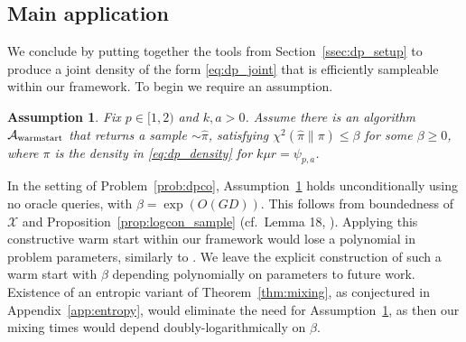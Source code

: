 \documentclass[11pt]{article}
\newtheorem{assumption}{Assumption}
\newcommand{\0}{\mathbf{0}}
\newcommand{\1}{\mathbf{1}}
\newcommand{\calA}{\mathcal{A}}
\newcommand{\calX}{\mathcal{X}}
\begin{document}
\subsection{Main application}

We conclude by putting together the tools from Section~\ref{ssec:dp_setup} to produce a joint density of the form \eqref{eq:dp_joint} that is efficiently sampleable within our framework. To begin we require an assumption.

\begin{assumption}\label{assume:warmstart}
Fix $p \in [1, 2)$ and $k, a > 0$. Assume there is an algorithm $\calA_{\textup{warmstart}}$ that returns a sample $\sim \hat{\pi}$, satisfying $\chi^2(\hat{\pi} \| \pi) \le \beta$ for some $\beta \ge 0$,
where $\pi$ is the density in \eqref{eq:dp_density} for $k\mu r = \psi_{p, a}$.
\end{assumption}

In the setting of Problem~\ref{prob:dpco}, Assumption~\ref{assume:warmstart} holds unconditionally using no oracle queries, with $\beta = \exp(O(GD))$. This follows from boundedness of $\calX$ and Proposition~\ref{prop:logcon_sample} (cf.\ Lemma 18, \cite{GopiLLST25}). Applying this constructive warm start within our framework would lose a polynomial in problem parameters, similarly to \cite{GopiLLST25}. We leave the explicit construction of such a warm start with $\beta$ depending polynomially on parameters to future work. Existence of an entropic variant of Theorem~\ref{thm:mixing}, as conjectured in Appendix~\ref{app:entropy}, would eliminate the need for Assumption~\ref{assume:warmstart}, as then our mixing times would depend doubly-logarithmically on $\beta$.
\end{document}
